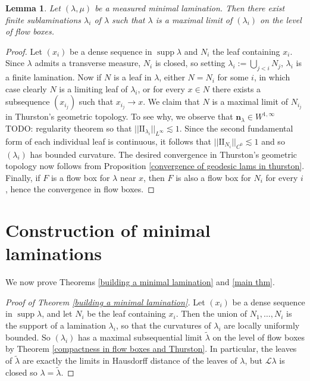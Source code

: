 \documentclass[reqno,11pt]{amsart}
\DeclareMathOperator{\supp}{supp}
\newcommand{\Leaves}{\mathscr L}
\newcommand{\Two}{\mathrm{I\!I}}
\newcommand{\normal}{\mathbf n}
\newtheorem{lemma}[theorem]{Lemma}
\theoremstyle{definition}
\numberwithin{equation}{section}
\begin{document}
\begin{lemma}\label{reduction to finite case}
Let $(\lambda, \mu)$ be a measured minimal lamination.
Then there exist finite sublaminations $\lambda_i$ of $\lambda$ such that $\lambda$ is a maximal limit of $(\lambda_i)$ on the level of flow boxes.
\end{lemma}
\begin{proof}
Let $(x_i)$ be a dense sequence in $\supp \lambda$ and $N_i$ the leaf containing $x_i$.
Since $\lambda$ admits a transverse measure, $N_i$ is closed, so setting $\lambda_i := \bigcup_{j < i} N_j$, $\lambda_i$ is a finite lamination.
Now if $N$ is a leaf in $\lambda$, either $N = N_i$ for some $i$, in which case clearly $N$ is a limiting leaf of $\lambda_i$, or for every $x \in N$ there exists a subsequence $(x_{i_j})$ such that $x_{i_j} \to x$.
We claim that $N$ is a maximal limit of $N_{i_j}$ in Thurston's geometric topology.
To see why, we observe that $\normal_\lambda \in W^{1, \infty}$ TODO: regularity theorem so that $||\Two_{\lambda_i}||_{L^\infty} \lesssim 1$.
Since the second fundamental form of each individual leaf is continuous, it follows that $||\Two_{N_i}||_{C^0} \lesssim 1$ and so $(\lambda_i)$ has bounded curvature.
The desired convergence in Thurston's geometric topology now follows from Proposition \ref{convergence of geodesic lams in thurston}.
Finally, if $F$ is a flow box for $\lambda$ near $x$, then $F$ is also a flow box for $N_i$ for every $i$, hence the convergence in flow boxes.
\end{proof}

\section{Construction of minimal laminations}\label{construction}
We now prove Theorems \ref{building a minimal lamination} and \ref{main thm}.

\begin{proof}[Proof of Theorem \ref{building a minimal lamination}]
Let $(x_i)$ be a dense sequence in $\supp \lambda$, and let $N_i$ be the leaf containing $x_i$.
Then the union of $N_1, \dots, N_i$ is the support of a lamination $\lambda_i$, so that the curvatures of $\lambda_i$ are locally uniformly bounded.
So $(\lambda_i)$ has a maximal subsequential limit $\tilde \lambda$ on the level of flow boxes by Theorem \ref{compactness in flow boxes and Thurston}.
In particular, the leaves of $\tilde \lambda$ are exactly the limits in Hausdorff distance of the leaves of $\lambda$, but $\Leaves \lambda$ is closed so $\lambda = \tilde \lambda$.
\end{proof}
\end{document}
